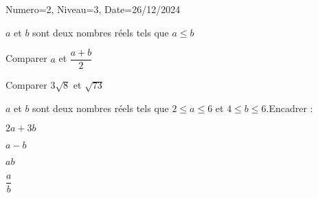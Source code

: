 \documentclass[a4paper,12pt]{article}
\begin{document}
\begin{Maquette}[DS]{Numero=2, Niveau=3, Date=26/12/2024}

\begin{exercice}
$a$ et $b$ sont deux nombres réels tels que $a\leq b$
\begin{enumerate}

\begin{minipage}{.5\linewidth}
\item{} Comparer $a$ et $\dfrac{a+b}{2}$ 
\end{minipage}%
\begin{minipage}{.5\linewidth}
\item{} Comparer $3\sqrt{8}$ et $\sqrt{73}$ 
\end{minipage}
\end{enumerate}
\begin{minipage}{.5\linewidth}
\end{minipage}%
\begin{minipage}{.5\linewidth}
\end{minipage}
\end{exercice}

\begin{exercice}
$a$ et $b$ sont deux nombres réels tels que $2\leq a\leq 6$ et $4\leq b\leq 6$.Encadrer :
\begin{minipage}{.24\linewidth}
$2a+3b$
\end{minipage}
\begin{minipage}{.24\linewidth}
$a-b$
\end{minipage}
\begin{minipage}{.24\linewidth}
$ab$ 
\end{minipage}
\begin{minipage}{.24\linewidth}
$\dfrac{a}{b}$ 
\end{minipage}%

\begin{minipage}{0.24\linewidth}
\end{minipage}
\begin{minipage}{0.24\linewidth}
\end{minipage}
\begin{minipage}{0.24\linewidth}
\end{minipage}
\begin{minipage}{0.24\linewidth}
\end{minipage}
\end{exercice}


\end{Maquette}
\end{document}
